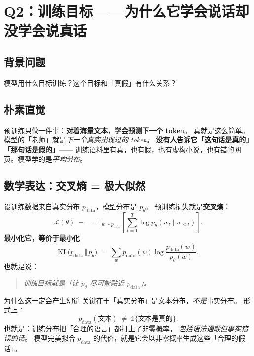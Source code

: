 \documentclass[11pt,a4paper]{ctexart}
\newcommand{\E}{\mathbb{E}}
\newcommand{\KL}{\mathrm{KL}}
\begin{document}
\section{Q2：训练目标——为什么它学会说话却没学会说真话}

\subsection{背景问题}

模型用什么目标训练？这个目标和「真假」有什么关系？

\subsection{朴素直觉}

\begin{intuitionblock}
预训练只做一件事：\textbf{对着海量文本，学会预测下一个 token}。
真就是这么简单。模型的「老师」就是\emph{下一个真实出现过的 token}。
\textbf{没有人告诉它「这句话是真的」「那句话是假的」}——
训练语料里有真，也有假，也有虚构小说，也有错的网页。模型学的是\emph{平均分布}。
\end{intuitionblock}

\subsection{数学表达：交叉熵 = 极大似然}

设训练数据来自真实分布 $p_{\text{data}}$，模型分布是 $p_\theta$。
预训练损失就是\textbf{交叉熵}：
\[
  \mathcal{L}(\theta)
  \;=\;
  -\,\E_{w \sim p_{\text{data}}}\!\left[\sum_{t=1}^{T} \log p_\theta(w_t \mid w_{<t})\right].
\]
\textbf{最小化它，等价于最小化}
\[
  \KL\!\big(p_{\text{data}} \,\Vert\, p_\theta\big)
  \;=\;
  \sum_{w} p_{\text{data}}(w) \log \frac{p_{\text{data}}(w)}{p_\theta(w)}.
\]
也就是说：
\begin{quote}
\textit{训练目标就是「让 $p_\theta$ 尽可能贴近 $p_{\text{data}}$」。}
\end{quote}

\begin{mathbox}{为什么这一定会产生幻觉}
关键在于「真实分布」是文本分布，\emph{不是}事实分布。
形式上：
\[
  p_{\text{data}}(\text{文本}) \;\neq\; \mathbb{1}\{\text{文本是真的}\}.
\]
也就是：训练分布把「合理的语言」都打上了非零概率，
\emph{包括语法通顺但事实错误的话}。
模型完美拟合 $p_{\text{data}}$ 的代价，就是它会以非零概率生成这些「合理的假话」。
\end{mathbox}
\end{document}
